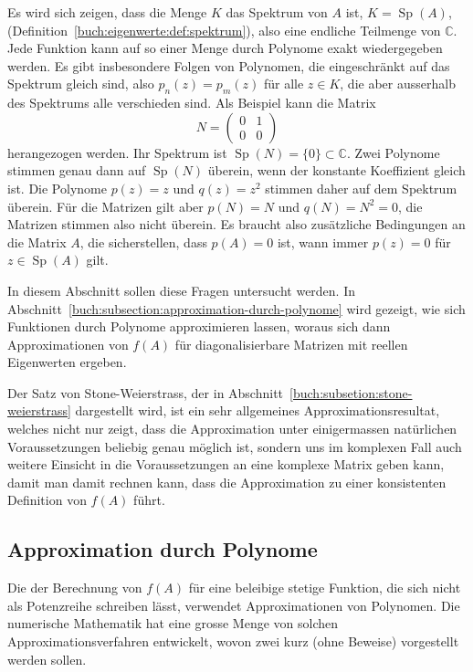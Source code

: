 Es wird sich zeigen, dass die Menge $K$ das Spektrum von $A$ ist,
$K=\operatorname{Sp}(A)$,
(Definition~\ref{buch:eigenwerte:def:spektrum}),
also eine endliche Teilmenge von $\mathbb{C}$.
Jede Funktion kann auf so einer Menge durch Polynome exakt wiedergegeben
werden.
Es gibt insbesondere Folgen von Polynomen, die eingeschränkt
auf das Spektrum gleich sind, also $p_n(z)=p_m(z)$ für alle $z\in K$,
die aber ausserhalb des Spektrums alle verschieden sind.
Als Beispiel kann die Matrix 
\[
N=\begin{pmatrix}0&1\\0&0\end{pmatrix}
\]
herangezogen werden.
Ihr Spektrum ist $\operatorname{Sp}(N)=\{0\}\subset\mathbb{C}$.
Zwei Polynome stimmen genau dann auf $\operatorname{Sp}(N)$ überein,
wenn der konstante Koeffizient gleich ist.
Die Polynome $p(z)=z$ und $q(z)=z^2$ stimmen daher auf dem Spektrum
überein.
Für die Matrizen gilt aber $p(N)=N$ und $q(N)=N^2=0$, die Matrizen
stimmen also nicht überein.
Es braucht also zusätzliche Bedingungen an die Matrix $A$, die
sicherstellen, dass $p(A)=0$ ist, wann immer $p(z)=0$ für
$z\in\operatorname{Sp}(A)$ gilt.

In diesem Abschnitt sollen diese Fragen untersucht werden.
In Abschnitt~\ref{buch:subsection:approximation-durch-polynome}
wird gezeigt, wie sich Funktionen durch Polynome approximieren
lassen, woraus sich dann Approximationen von $f(A)$ für diagonalisierbare
Matrizen mit reellen Eigenwerten ergeben.

Der Satz von Stone-Weierstrass, der in
%
%
Abschnitt~\ref{buch:subsetion:stone-weierstrass} dargestellt wird,
ist ein sehr allgemeines Approximationsresultat, welches nicht nur
zeigt, dass die Approximation unter einigermassen natürlichen Voraussetzungen
beliebig genau möglich ist, sondern uns im komplexen Fall auch
weitere Einsicht in die Voraussetzungen an eine
komplexe Matrix geben kann, damit man damit rechnen kann,
dass die Approximation zu einer konsistenten Definition von $f(A)$ führt.

%
%
\subsection{Approximation durch Polynome
\label{buch:subsection:approximation-durch-polynome}}
Die der Berechnung von $f(A)$ für eine beleibige stetige Funktion,
die sich nicht als Potenzreihe schreiben lässt, verwendet Approximationen
von Polynomen.
Die numerische Mathematik hat eine grosse Menge von solchen
Approximationsverfahren entwickelt, wovon zwei kurz (ohne Beweise)
vorgestellt werden sollen.

